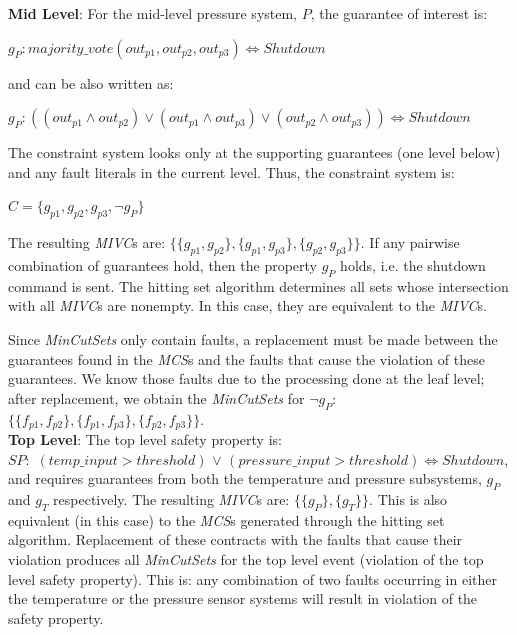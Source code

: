 \textbf{Mid Level}: For the mid-level pressure system, $P$, the guarantee of interest is: 
\begin{center}
    $g_P : majority\_vote(out_{p1}, out_{p2}, out_{p3}) \iff Shutdown$
\end{center}
and can be also written as: 
\begin{center}
    $g_P: ((out_{p1} \land out_{p2}) \lor (out_{p1} \land out_{p3}) \lor (out_{p2} \land out_{p3})) \iff Shutdown$
\end{center}

The constraint system looks only at the supporting guarantees (one level below) and any fault literals in the current level. Thus, the constraint system is: 
\begin{center}
    $C = \{g_{p1}, g_{p2}, g_{p3}, \neg g_P\}$
\end{center}

The resulting \textit{MIVC}s are: $\{\{g_{p1}, g_{p2}\}, \{g_{p1}, g_{p3}\}, \{g_{p2}, g_{p3}\}\}$. If any pairwise combination of guarantees hold, then the property $g_P$ holds, i.e. the shutdown command is sent. The hitting set algorithm determines all sets whose intersection with all \textit{MIVC}s are nonempty. In this case, they are equivalent to the \textit{MIVC}s. 

Since \textit{MinCutSets} only contain faults, a replacement must be made between the guarantees found in the \textit{MCS}s and the faults that cause the violation of these guarantees. We know those faults due to the processing done at the leaf level; after replacement, we obtain the \textit{MinCutSets} for $\neg g_P$: $\{\{f_{p1}, f_{p2}\}, \{f_{p1}, f_{p3}\}, \{f_{p2}, f_{p3}\}\}$.\\

\textbf{Top Level}: The top level safety property is:\\ $SP : $  $(temp\_input > threshold)$ $\lor$ $(pressure\_input > threshold) \iff Shutdown$, and requires guarantees from both the temperature and pressure subsystems, $g_P$ and $g_T$ respectively. The resulting \textit{MIVC}s are: $\{\{g_P\}, \{g_T\}\}$. This is also equivalent (in this case) to the \textit{MCS}s generated through the hitting set algorithm. Replacement of these contracts with the faults that cause their violation produces all \textit{MinCutSets} for the top level event (violation of the top level safety property). This is: any combination of two faults occurring in either the temperature or the pressure sensor systems will result in violation of the safety property. 

